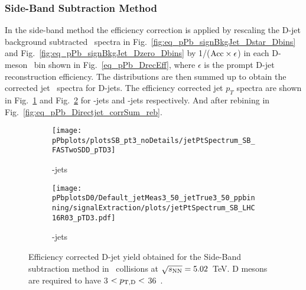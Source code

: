 %


\subsubsection{Side-Band Subtraction Method}
In the side-band method the efficiency correction is applied by rescaling the D-jet background subtracted \pt\ spectra in Fig.~\ref{fig:eq_pPb_signBkgJet_Dstar_Dbins} and Fig.~\ref{fig:eq_pPb_signBkgJet_Dzero_Dbins}
by 1/(${\rm Acc} \times \epsilon$) in each D-meson \pt\ bin shown in Fig.~\ref{eq_pPb_DrecEff}, where $\epsilon$ is the prompt D-jet reconstruction efficiency.
The distributions are then summed up to obtain the corrected jet \pt\ spectra for D-jets. 
The efficiency corrected jet $p_{T}$ spectra are shown in Fig.~\ref{fig:eq_pPb_Directjet_corrSum_Dstar} and Fig.~\ref{fig:eq_pPb_Directjet_corrSum_Dzero} for \Dstar-jets and \Dzero-jets respectively. And after rebining in Fig.~\ref{fig:eq_pPb_Directjet_corrSum_reb}.

\begin{figure}[bth]
\centering
\begin{subfigure}[b]{0.45\textwidth}
\texttt{[image: pPbplots/plotsSB\_pt3\_noDetails/jetPtSpectrum\_SB\_FASTwoSDD\_pTD3]}
\label{fig:eq_pPb_Directjet_corrSum_Dstar}
\caption{\Dstar-jets}
\end{subfigure}
\begin{subfigure}[b]{0.45\textwidth}
\texttt{[image: pPbplotsD0/Default\_jetMeas3\_50\_jetTrue3\_50\_ppbinning/signalExtraction/plots/jetPtSpectrum\_SB\_LHC16R03\_pTD3.pdf]}
\caption{\Dzero-jets}
\label{fig:eq_pPb_Directjet_corrSum_Dzero}
\end{subfigure}
\caption{Efficiency corrected D-jet yield obtained for the Side-Band subtraction method in \pPb\ collisions at $\sqrt{s_{\rm NN}}=5.02$~TeV. D mesons are required to have 3 $< p_{\mathrm{T,D}}<$ 36~\GeVc.}
\label{fig:eq_pPb_Directjet_corrSum}
\end{figure}

